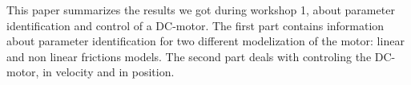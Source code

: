 This paper summarizes the results we got during workshop 1, about  parameter identification and control of a DC-motor. The first part contains information about parameter identification for two different modelization of the motor: linear and non linear frictions models. The second part deals with controling the DC-motor, in velocity and in position. 